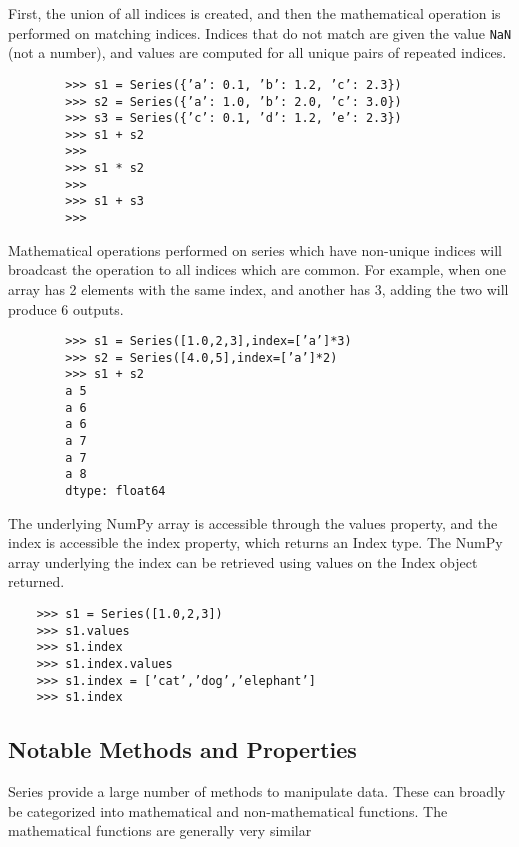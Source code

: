 \documentclass[KSmain.tex]{subfiles}
\begin{document}
	\noindent First, the union of all indices is created, and then the mathematical operation
	is performed on matching indices. Indices that do not match are given the value \texttt{NaN} (not a number), and
	values are computed for all unique pairs of repeated indices.
	\begin{framed}
		\begin{verbatim}
		>>> s1 = Series({’a’: 0.1, ’b’: 1.2, ’c’: 2.3})
		>>> s2 = Series({’a’: 1.0, ’b’: 2.0, ’c’: 3.0})
		>>> s3 = Series({’c’: 0.1, ’d’: 1.2, ’e’: 2.3})
		>>> s1 + s2
		>>>
		>>> s1 * s2
		>>>
		>>> s1 + s3
		>>>
		\end{verbatim}
	\end{framed}
	Mathematical operations performed on series which have non-unique indices will broadcast the operation
	to all indices which are common. For example, when one array has 2 elements with the same
	index, and another has 3, adding the two will produce 6 outputs.
	\begin{framed}
		\begin{verbatim}
		>>> s1 = Series([1.0,2,3],index=[’a’]*3)
		>>> s2 = Series([4.0,5],index=[’a’]*2)
		>>> s1 + s2
		a 5
		a 6
		a 6
		a 7
		a 7
		a 8
		dtype: float64
		\end{verbatim}
	\end{framed}
	The underlying NumPy array is accessible through the values property, and the index is accessible the
	index property, which returns an Index type. The NumPy array underlying the index can be retrieved
	using values on the Index object returned.
	\begin{framed}
	\begin{verbatim}
	>>> s1 = Series([1.0,2,3])
	>>> s1.values
	>>> s1.index
	>>> s1.index.values
	>>> s1.index = [’cat’,’dog’,’elephant’]
	>>> s1.index
	\end{verbatim}
\end{framed}

\newpage
\subsection{Notable Methods and Properties}
Series provide a large number of methods to manipulate data. These can broadly be categorized into
mathematical and non-mathematical functions. The mathematical functions are generally very similar
\end{document}
